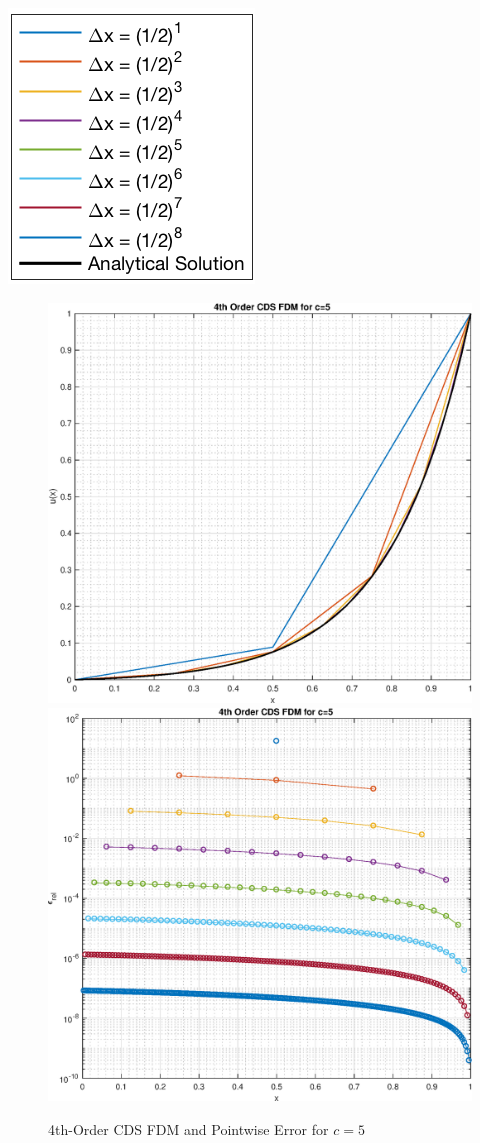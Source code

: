 \documentclass[10pt, reqno]{article}		%
\numberwithin{equation}{section}
\begin{document}
\begin{center}
	\includegraphics[height = 0.17\linewidth]{legend}
\end{center}

\newpage

\begin{figure}[H]
	\begin{center}
		\includegraphics[width = 0.49\linewidth]{solution_4th_order_cds_c_5}
		\includegraphics[width = 0.49\linewidth]{pointwise_error_4th_order_cds_c_5}
		\caption{4th-Order CDS FDM and Pointwise Error for $c = 5$}
	\end{center}
\end{figure}
\end{document}
